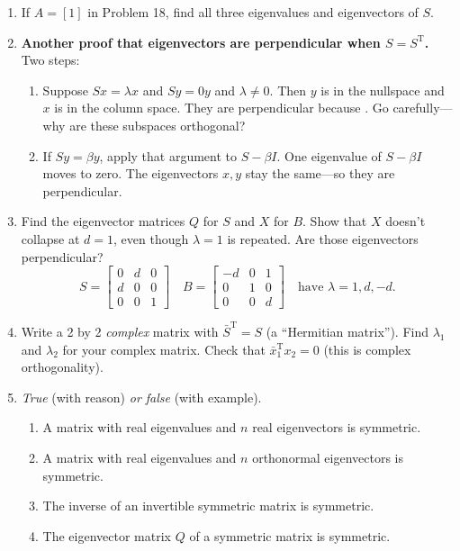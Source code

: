 \documentclass[14pt, a4paper]{article}
\begin{document}
\begin{enumerate}
    \item If $A = [1]$ in Problem 18, find all three eigenvalues and eigenvectors of $S$.

    \item \textbf{Another proof that eigenvectors are perpendicular when $S = S^{\mathrm{T}}$.} Two steps:
          \begin{enumerate}
              \item Suppose $Sx = \lambda x$ and $Sy = 0y$ and $\lambda \neq 0$. Then $y$ is in the nullspace and $x$ is in the column space. They are perpendicular because \underline{\hspace{1cm}}. Go carefully—why are these subspaces orthogonal?
              \item If $Sy = \beta y$, apply that argument to $S - \beta I$. One eigenvalue of $S - \beta I$ moves to zero. The eigenvectors $x, y$ stay the same—so they are perpendicular.
          \end{enumerate}

    \item Find the eigenvector matrices $Q$ for $S$ and $X$ for $B$. Show that $X$ doesn't collapse at $d = 1$, even though $\lambda = 1$ is repeated. Are those eigenvectors perpendicular?
          \[
              S = \begin{bmatrix} 0 & d & 0 \\ d & 0 & 0 \\ 0 & 0 & 1 \end{bmatrix} \quad B = \begin{bmatrix} -d & 0 & 1 \\ 0 & 1 & 0 \\ 0 & 0 & d \end{bmatrix} \quad \text{have } \lambda = 1, d, -d.
          \]

    \item Write a 2 by 2 \textit{complex} matrix with $\bar{S}^{\mathrm{T}} = S$ (a ``Hermitian matrix''). Find $\lambda_1$ and $\lambda_2$ for your complex matrix. Check that $\bar{x}_1^{\mathrm{T}}x_2 = 0$ (this is complex orthogonality).

    \item \textit{True} (with reason) \textit{or false} (with example).
          \begin{enumerate}
              \item A matrix with real eigenvalues and $n$ real eigenvectors is symmetric.
              \item A matrix with real eigenvalues and $n$ orthonormal eigenvectors is symmetric.
              \item The inverse of an invertible symmetric matrix is symmetric.
              \item The eigenvector matrix $Q$ of a symmetric matrix is symmetric.
          \end{enumerate}


\end{enumerate}
\end{document}
